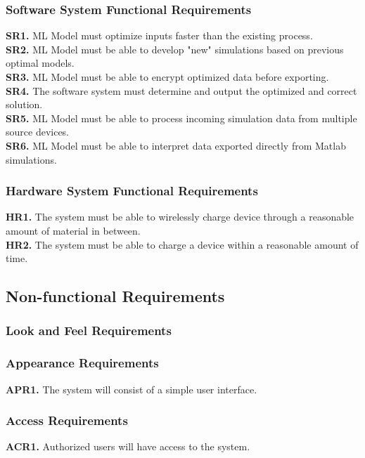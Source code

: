 \documentclass[12pt, titlepage]{article}
\begin{document}
\subsubsection{Software System Functional Requirements}
\textbf{SR1.} ML Model must optimize inputs faster than the existing process.\\
\textbf{SR2.} ML Model must be able to develop "new" simulations based on previous optimal models.\\
\textbf{SR3.} ML Model must be able to encrypt optimized data before exporting.\\
\color{red}
\textbf{SR4.} The software system must determine and output the optimized and correct solution.\\
\textbf{SR5.} ML Model must be able to process incoming simulation data from multiple source devices.\\
\textbf{SR6.} ML Model must be able to interpret data exported directly from Matlab simulations.

\color{black}

\subsubsection{Hardware System Functional Requirements}
\textbf{HR1.} The system must be able to wirelessly charge device through a reasonable amount of material in between.\\
\textbf{HR2.} The system must be able to charge a device within a reasonable amount of time.\\

\subsection{Non-functional Requirements}
\subsubsection{Look and Feel Requirements}
\subsubsection{Appearance Requirements}
\textbf{APR1.} The system will consist of a simple user interface.

\subsubsection{Access Requirements}
\color{red}
\textbf{ACR1.} Authorized users will have access to the system.
\color{black}
\end{document}
